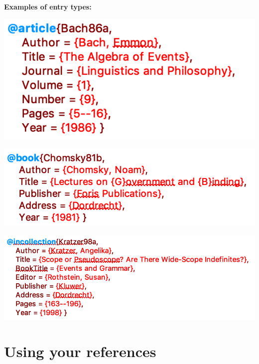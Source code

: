 \begin{frame}[fragile]

\textbf{Examples of entry types:}

\bigskip


\includegraphics[scale=.5]{../../texfiles-beamer/tex-material/WissArb-latex/xelatex-bib-article}

\includegraphics[scale=.5]{../../texfiles-beamer/tex-material/WissArb-latex/xelatex-bib-book}

\includegraphics[scale=.5]{../../texfiles-beamer/tex-material/WissArb-latex/xelatex-bib-incollection}

\end{frame}

\section{Using your references}

